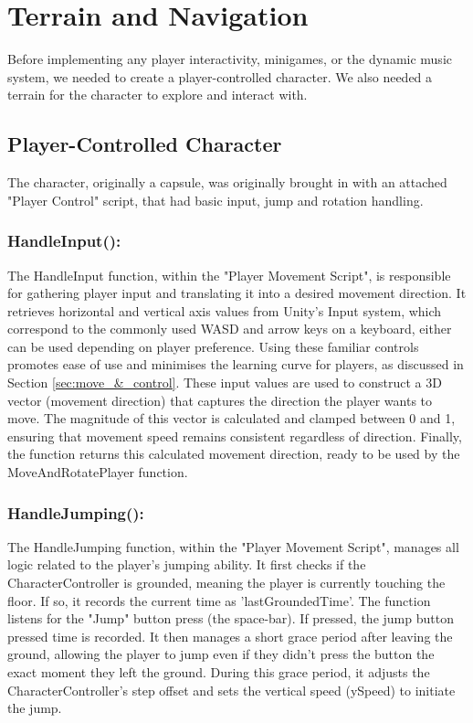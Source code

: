 \documentclass{l4proj}
\begin{document}
\section{Terrain and Navigation}
Before implementing any player interactivity, minigames, or the dynamic music system, we needed to create a player-controlled character. We also needed a terrain for the character to explore and interact with.

\subsection{Player-Controlled Character}\label{sec:player_script}
The character, originally a capsule, was originally brought in with an attached "Player Control" script, that had basic input, jump and rotation handling.

\subsubsection{HandleInput():}
The HandleInput function, within the "Player Movement Script", is responsible for gathering player input and translating it into a desired movement direction. It retrieves horizontal and vertical axis values from Unity's Input system, which correspond to the commonly used WASD and arrow keys on a keyboard, either can be used depending on player preference. Using these familiar controls promotes ease of use and minimises the learning curve for players, as discussed in Section \ref{sec:move_&_control}. These input values are used to construct a 3D vector (movement direction) that captures the direction the player wants to move. The magnitude of this vector is calculated and clamped between 0 and 1, ensuring that movement speed remains consistent regardless of direction. Finally, the function returns this calculated movement direction, ready to be used by the MoveAndRotatePlayer function.

\subsubsection{HandleJumping():}
The HandleJumping function, within the "Player Movement Script", manages all logic related to the player's jumping ability. It first checks if the CharacterController is grounded, meaning the player is currently touching the floor. If so, it records the current time as 'lastGroundedTime'. The function listens for the "Jump" button press (the space-bar). If pressed, the jump button pressed time is recorded. It then manages a short grace period after leaving the ground, allowing the player to jump even if they didn't press the button the exact moment they left the ground. During this grace period, it adjusts the CharacterController's step offset and sets the vertical speed (ySpeed) to initiate the jump.
\end{document}
